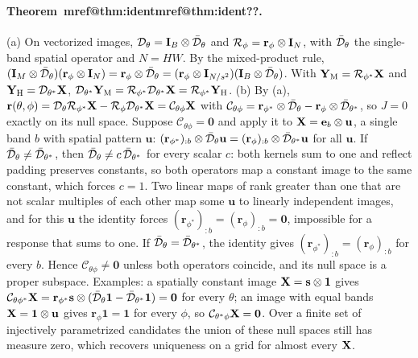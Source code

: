 \documentclass[10pt,twocolumn,letterpaper]{article}
\makeatletter
\newcommand{\mref}[1]{\ifcsname mref@#1\endcsname\csname mref@#1\endcsname\else\textbf{??}\fi}
\makeatother
\begin{document}
\paragraph{Theorem~\mref{thm:ident}.} (a) On vectorized images, $\mathcal{D}_\theta=\mathbf{I}_B\otimes\bar{\mathcal{D}}_\theta$ and $\mathcal{R}_\phi=\mathbf{r}_\phi\otimes\mathbf{I}_N$, with $\bar{\mathcal{D}}_\theta$ the single-band spatial operator and $N=HW$. By the mixed-product rule, $(\mathbf{I}_M\otimes\bar{\mathcal{D}}_\theta)(\mathbf{r}_\phi\otimes\mathbf{I}_N)=\mathbf{r}_\phi\otimes\bar{\mathcal{D}}_\theta=(\mathbf{r}_\phi\otimes\mathbf{I}_{N/s^2})(\mathbf{I}_B\otimes\bar{\mathcal{D}}_\theta)$. With $\mathbf{Y}_{\mathrm{M}}=\mathcal{R}_{\phi^*}\mathbf{X}$ and $\mathbf{Y}_{\mathrm{H}}=\mathcal{D}_{\theta^*}\mathbf{X}$, $\mathcal{D}_{\theta^*}\mathbf{Y}_{\mathrm{M}}=\mathcal{R}_{\phi^*}\mathcal{D}_{\theta^*}\mathbf{X}=\mathcal{R}_{\phi^*}\mathbf{Y}_{\mathrm{H}}$.
(b) By (a), $\mathbf{r}(\theta,\phi)=\mathcal{D}_\theta\mathcal{R}_{\phi^*}\mathbf{X}-\mathcal{R}_\phi\mathcal{D}_{\theta^*}\mathbf{X}=\mathcal{C}_{\theta\phi}\mathbf{X}$ with $\mathcal{C}_{\theta\phi}=\mathbf{r}_{\phi^*}\otimes\bar{\mathcal{D}}_\theta-\mathbf{r}_\phi\otimes\bar{\mathcal{D}}_{\theta^*}$, so $J=0$ exactly on its null space. Suppose $\mathcal{C}_{\theta\phi}=\mathbf{0}$ and apply it to $\mathbf{X}=\mathbf{e}_b\otimes\mathbf{u}$, a single band $b$ with spatial pattern $\mathbf{u}$: $(\mathbf{r}_{\phi^*})_{:b}\otimes\bar{\mathcal{D}}_\theta\mathbf{u}=(\mathbf{r}_\phi)_{:b}\otimes\bar{\mathcal{D}}_{\theta^*}\mathbf{u}$ for all $\mathbf{u}$. If $\bar{\mathcal{D}}_\theta\neq\bar{\mathcal{D}}_{\theta^*}$, then $\bar{\mathcal{D}}_\theta\neq c\,\bar{\mathcal{D}}_{\theta^*}$ for every scalar $c$: both kernels sum to one and reflect padding preserves constants, so both operators map a constant image to the same constant, which forces $c=1$. Two linear maps of rank greater than one that are not scalar multiples of each other map some $\mathbf{u}$ to linearly independent images, and for this $\mathbf{u}$ the identity forces $(\mathbf{r}_{\phi^*})_{:b}=(\mathbf{r}_\phi)_{:b}=\mathbf{0}$, impossible for a response that sums to one. If $\bar{\mathcal{D}}_\theta=\bar{\mathcal{D}}_{\theta^*}$, the identity gives $(\mathbf{r}_{\phi^*})_{:b}=(\mathbf{r}_\phi)_{:b}$ for every $b$. Hence $\mathcal{C}_{\theta\phi}\neq\mathbf{0}$ unless both operators coincide, and its null space is a proper subspace. Examples: a spatially constant image $\mathbf{X}=\mathbf{s}\otimes\mathbf{1}$ gives $\mathcal{C}_{\theta\phi^*}\mathbf{X}=\mathbf{r}_{\phi^*}\mathbf{s}\otimes(\bar{\mathcal{D}}_\theta\mathbf{1}-\bar{\mathcal{D}}_{\theta^*}\mathbf{1})=\mathbf{0}$ for every $\theta$; an image with equal bands $\mathbf{X}=\mathbf{1}\otimes\mathbf{u}$ gives $\mathbf{r}_\phi\mathbf{1}=\mathbf{1}$ for every $\phi$, so $\mathcal{C}_{\theta^*\phi}\mathbf{X}=\mathbf{0}$. Over a finite set of injectively parametrized candidates the union of these null spaces still has measure zero, which recovers uniqueness on a grid for almost every $\mathbf{X}$.
\end{document}
